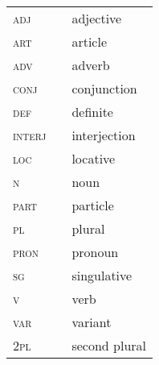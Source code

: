 \begin{tabular}{>{\scshape}lll}
adj&  & adjective\\
art& &article\\
adv& &adverb\\
conj& &conjunction\\
def& &definite\\
interj& &interjection\\
loc& &locative\\
n& &noun\\
part& &particle\\
pl& &plural\\
pron& &pronoun\\
sg& & singulative\\
v& &verb\\
var& &variant\\
2pl& &second plural\\
\end{tabular}
